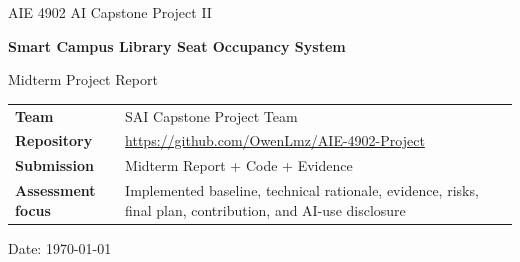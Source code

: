 \documentclass[11pt,a4paper]{article}
\newcommand{\projecttitle}{Smart Campus Library Seat Occupancy System}
\newcommand{\coursename}{AIE 4902 AI Capstone Project II}
\newcommand{\reporttype}{Midterm Project Report}
\newcommand{\repositorylink}{\url{https://github.com/OwenLmz/AIE-4902-Project}}
\begin{document}
\begin{titlepage}
  \centering
  \vspace*{1.2cm}
  {\Large \coursename\par}
  \vspace{1.2cm}
  {\huge \textbf{\projecttitle}\par}
  \vspace{0.5cm}
  {\Large \reporttype\par}
  \vspace{1.5cm}
  \begin{tabular}{>{\bfseries}p{4cm}p{9cm}}
    Team & SAI Capstone Project Team \\
    Repository & \repositorylink \\
    Submission & Midterm Report + Code + Evidence \\
    Assessment focus & Implemented baseline, technical rationale, evidence, risks, final plan, contribution, and AI-use disclosure \\
  \end{tabular}
  \vfill
  {\large Date: \today\par}
\end{titlepage}

\tableofcontents
\newpage
{}











\appendix

\end{document}
